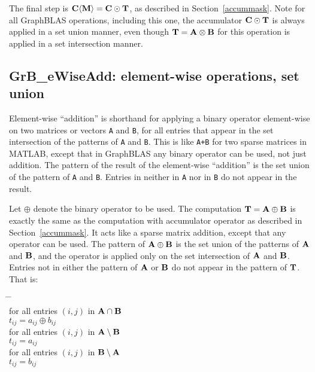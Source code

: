 \documentclass[12pt]{article}
\begin{document}
The final step is ${\bf C \langle M \rangle  = C \odot T}$, as described in
Section~\ref{accummask}.  Note for all GraphBLAS operations, including this
one, the accumulator ${\bf C \odot T}$ is always applied in a set union manner,
even though ${\bf T = A \otimes B}$ for this operation is applied in a set
intersection manner.

\newpage
\subsection{{\sf GrB\_eWiseAdd:} element-wise operations, set union} %
\label{eWiseAdd}

Element-wise ``addition'' is shorthand for applying a binary operator
element-wise on two matrices or vectors \verb'A' and \verb'B', for all entries
that appear in the set intersection of the patterns of \verb'A' and \verb'B'.
This is like \verb'A+B' for two sparse matrices in MATLAB, except that in
GraphBLAS any binary operator can be used, not just addition.  The pattern of
the result of the element-wise ``addition'' is the set union of the pattern of
\verb'A' and \verb'B'.  Entries in neither in \verb'A' nor in \verb'B' do
not appear in the result.

Let $\oplus$ denote the binary operator to be used.  The computation ${\bf T =
A \oplus B}$ is exactly the same as the computation with accumulator operator
as described in Section~\ref{accummask}.  It acts like a sparse matrix
addition, except that any operator can be used.  The pattern of ${\bf A \oplus
B}$ is the set union of the patterns of ${\bf A}$ and ${\bf B}$, and the
operator is applied only on the set intersection of ${\bf A}$ and ${\bf B}$.
Entries not in either the pattern of ${\bf A}$ or ${\bf B}$ do not appear in
the pattern of ${\bf T}$.  That is:
    \vspace{-0.2in}
    {\small
    \begin{tabbing}
    \hspace{2em} \= \hspace{2em} \= \hspace{2em} \= \\
    \> for all entries $(i,j)$ in ${\bf A \cap B}$ \\
    \> \> $t_{ij} = a_{ij} \oplus b_{ij}$ \\
    \> for all entries $(i,j)$ in ${\bf A \setminus B}$ \\
    \> \> $t_{ij} = a_{ij}$ \\
    \> for all entries $(i,j)$ in ${\bf B \setminus A}$ \\
    \> \> $t_{ij} = b_{ij}$
    \end{tabbing}
    }
\end{document}
